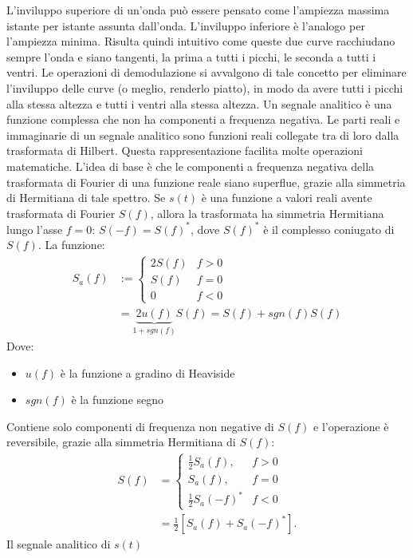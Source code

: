 \documentclass[12pt,a4paper, twoside, openright]{report}
\begin{document}
L'inviluppo superiore di un'onda può essere pensato come l'ampiezza massima istante per istante assunta dall'onda.
L'inviluppo inferiore è l'analogo per l'ampiezza minima.
Risulta quindi intuitivo come queste due curve racchiudano sempre l'onda e siano tangenti, la prima a tutti i picchi, le seconda a tutti i ventri.
Le operazioni di demodulazione si avvalgono di tale concetto per eliminare l'inviluppo delle curve (o meglio, renderlo piatto), in modo da avere tutti i picchi alla stessa altezza e tutti i ventri alla stessa altezza.
\newline
Un segnale analitico è una funzione complessa che non ha componenti a frequenza negativa.
Le parti reali e immaginarie di un segnale analitico sono funzioni reali collegate tra di loro dalla trasformata di Hilbert.
Questa rappresentazione facilita molte operazioni matematiche.
L’idea di base è che le componenti a frequenza negativa della trasformata di Fourier di una funzione reale siano superflue, grazie alla simmetria di Hermitiana di tale spettro.
Se $s(t)$ è una funzione a valori reali avente trasformata di Fourier $S(f)$, allora la trasformata ha simmetria Hermitiana lungo l’asse $f=0$:
$S(-f)=S(f)^*$, dove $S(f)^*$ è il complesso coniugato di $S(f)$. La funzione:
\begin{align}
	S_a(f) &:= \begin{cases} 2S(f) & f>0 \\ S(f) & f=0 \\ 0 & f<0 \end{cases} \\
	&= \underbrace{2u(f)}_{1+sgn(f)}S(f) = S(f)+sgn(f)S(f)
\end{align}
Dove:
\begin{itemize}
	\item $u(f)$ è la funzione a gradino di Heaviside
	\item $sgn(f)$ è la funzione segno
\end{itemize}
Contiene solo componenti di frequenza non negative di $S(f)$ e l’operazione è reversibile, grazie alla simmetria Hermitiana di $S(f)$:
\begin{align}
	S(f) &= \begin{cases} \frac{1}{2} S_a (f), & f>0 \\ S_a(f), & f=0 \\ \frac{1}{2}			S_a(-f)^* & f<0 \end{cases} \\
	&=\frac{1}{2}[S_a(f)+S_a(-f)^*].
\end{align}
Il segnale analitico di $s(t)$
\end{document}
